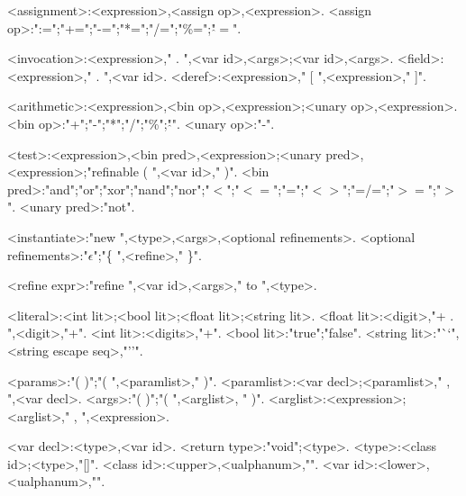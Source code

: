 \begin{grammar}
<assignment>:<expression>,<assign op>,<expression>.
<assign op>:":=";"+=";"-=";"*=";"/=";"\%=";"$\hat{}=$".

<invocation>:<expression>," . ",<var id>,<args>;<var id>,<args>.
<field>:<expression>," . ",<var id>.
<deref>:<expression>," [ ",<expression>," ]".

<arithmetic>:<expression>,<bin op>,<expression>;<unary op>,<expression>.
<bin op>:"+";"-";"*";"/";"\%";"$\hat{}$".
<unary op>:"-".

<test>:<expression>,<bin pred>,<expression>;<unary pred>,<expression>;"refinable ( ",<var id>," )".
<bin pred>:"and";"or";"xor";"nand";"nor";"$<$";"$<=$";"=";"$<>$";"=/=";"$>=$";"$>$".
<unary pred>:"not".

<instantiate>:"new ",<type>,<args>,<optional refinements>.
<optional refinements>:"$\epsilon$";"\{ ",<refine>,"{\small *} \}".

<refine expr>:"refine ",<var id>,<args>," to ",<type>.

<literal>:<int lit>;<bool lit>;<float lit>;<string lit>.
<float lit>:<digit>,"{\small +} . ",<digit>,"{\small +}".
<int lit>:<digits>,"{\small +}".
<bool lit>:"true";"false".
<string lit>:"``",<string escape seq>,"''".

<params>:"( )";"( ",<paramlist>," )".
<paramlist>:<var decl>;<paramlist>," , ",<var decl>.
<args>:"( )";"( ",<arglist>, " )".
<arglist>:<expression>;<arglist>," , ",<expression>.

<var decl>:<type>,<var id>.
<return type>:"void";<type>.
<type>:<class id>;<type>,"[]".
<class id>:<upper>,<ualphanum>,"{\small *}".
<var id>:<lower>,<ualphanum>,"{\small *}".

\end{grammar}
